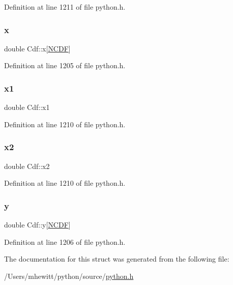 Definition at line 1211 of file python.\+h.

\mbox{\label{struct_cdf_a34302814d1d7d8176fda7a32bf3e6cd1}} 
\subsubsection{\texorpdfstring{x}{x}}
{\footnotesize\ttfamily double Cdf\+::x\mbox{[}\hyperlink{python_8h_a8fcad90a1005b8d2b876efbafa401305}{N\+C\+DF}\mbox{]}}



Definition at line 1205 of file python.\+h.

\mbox{\label{struct_cdf_abc6326171a363a5a3a5d6a82009a7194}} 
\subsubsection{\texorpdfstring{x1}{x1}}
{\footnotesize\ttfamily double Cdf\+::x1}



Definition at line 1210 of file python.\+h.

\mbox{\label{struct_cdf_a1e4ac80d3ed6cfe9da3a64b2aac5752a}} 
\subsubsection{\texorpdfstring{x2}{x2}}
{\footnotesize\ttfamily double Cdf\+::x2}



Definition at line 1210 of file python.\+h.

\mbox{\label{struct_cdf_aa9657822ac7705998c85468c970f1cd7}} 
\subsubsection{\texorpdfstring{y}{y}}
{\footnotesize\ttfamily double Cdf\+::y\mbox{[}\hyperlink{python_8h_a8fcad90a1005b8d2b876efbafa401305}{N\+C\+DF}\mbox{]}}



Definition at line 1206 of file python.\+h.



The documentation for this struct was generated from the following file\+:\begin{DoxyCompactItemize}
\item 
/\+Users/mhewitt/python/source/\hyperlink{python_8h}{python.\+h}\end{DoxyCompactItemize}

